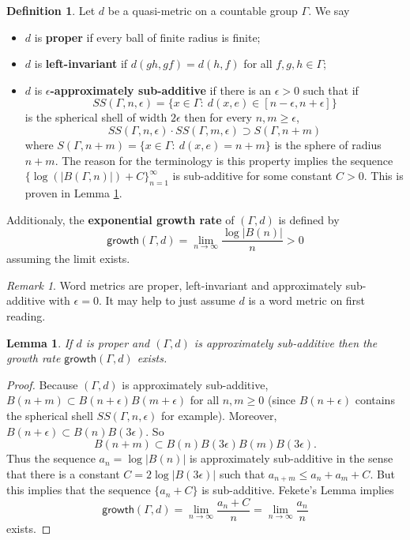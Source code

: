 \documentclass[12pt]{article}
\theoremstyle{plain}
\newtheorem{lem}[thm]{Lemma}
\theoremstyle{definition}
\newtheorem{defn}{Definition}
\theoremstyle{remark}
\newtheorem{remark}{Remark}
\newcommand{\G}{\Gamma}
\newcommand{\eps}{\epsilon}
\renewcommand\a{\alpha}
\begin{document}
\begin{defn}\label{D:qm-properties}
Let $d$ be a quasi-metric on a countable group $\G$. We say 
\begin{itemize}
    \item $d$  is {\bf proper} if every ball of finite radius is finite;
    \item $d$ is {\bf left-invariant} if $d(gh,gf)=d(h,f)$ for all $f,g,h\in \G$;
    \item $d$ is {\bf $\eps$-approximately sub-additive} if there is an $\eps>0$ such that    if 
    $$SS(\G,n,\eps)=\{x\in \G:~d(x,e) \in [n-\eps,n+\eps]\}$$
is the spherical shell of width $2\eps$ then for every $n,m\ge \eps$,
$$SS(\G,n,\eps)\cdot SS(\G,m,\eps) \supset S(\G,n+m)$$
where $S(\G,n+m)=\{x\in \G:~d(x,e)=n+m\}$ is the sphere of radius $n+m$. The reason for the terminology is this property implies the sequence $\{\log(|B(\G,n)|)+C\}_{n=1}^\infty$ is sub-additive for some constant $C>0$. This is proven in Lemma \ref{L:growth0}.

\end{itemize}
Additionaly, the \textbf{exponential growth rate} of $(\G,d)$ is defined by
    $$\mathsf{growth}(\G,d) = \lim_{n\to\infty} \frac{\log |B(n)|}{n}>0$$
    assuming the limit exists. 
\end{defn}

\begin{remark}
    Word metrics are proper, left-invariant and approximately sub-additive with $\eps=0$. It may help to just assume $d$ is a word metric on first reading. 
\end{remark}

\begin{lem}\label{L:growth0}
    If $d$ is proper and $(\G,d)$ is approximately sub-additive then the growth rate $\mathsf{growth}(\G,d)$ exists. 
\end{lem}

\begin{proof}
Because $(\G,d)$ is approximately sub-additive,  $B(n+m) \subset B(n+\eps)B(m+\eps)$ for all $n,m \ge 0$ (since $B(n+\eps)$ contains the spherical shell $SS(\G,n,\eps)$ for example). Moreover, $B(n+\eps) \subset B(n)B(3\eps)$. So 
    $$B(n+m) \subset B(n)B(3\eps)B(m)B(3\eps).$$
    Thus the sequence $a_n = \log |B(n)|$ is approximately sub-additive in the sense that there is a constant $C=2\log|B(3\eps)|$ such that $a_{n+m}\le a_n + a_m + C$. But this implies that the sequence $\{a_n+C\}$ is sub-additive. Fekete's Lemma implies
    $$\mathsf{growth}(\G,d)=\lim_{n\to\infty} \frac{a_n+C}{n} =\lim_{n\to\infty} \frac{a_n}{n}$$
    exists.
\end{proof}
\end{document}
